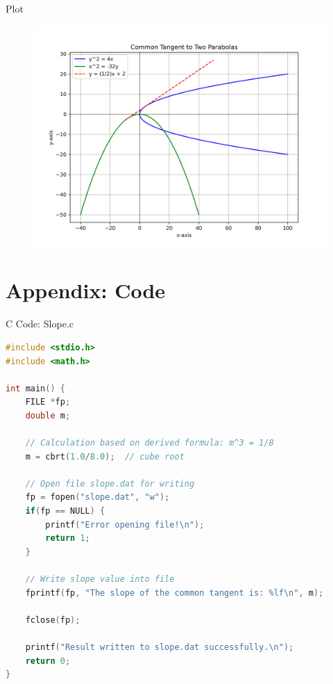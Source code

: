 \documentclass{beamer}
\numberwithin{equation}{section}
\theoremstyle{remark}
\begin{document}
\begin{frame}{Plot}
    \begin{figure}[H]
    \centering
    \includegraphics[width=0.9\columnwidth]{figs/01.png}
    \caption{}
    \label{fig:placeholder}
\end{figure}
\end{frame}
\section*{Appendix: Code}

\begin{frame}[fragile]{C Code: Slope.c}
\begin{lstlisting}[language=C]
#include <stdio.h>
#include <math.h>

int main() {
    FILE *fp;
    double m;

    // Calculation based on derived formula: m^3 = 1/8
    m = cbrt(1.0/8.0);  // cube root

    // Open file slope.dat for writing
    fp = fopen("slope.dat", "w");
    if(fp == NULL) {
        printf("Error opening file!\n");
        return 1;
    }

    // Write slope value into file
    fprintf(fp, "The slope of the common tangent is: %lf\n", m);

    fclose(fp);

    printf("Result written to slope.dat successfully.\n");
    return 0;
}


    \end{lstlisting}
\end{frame}
\end{document}
